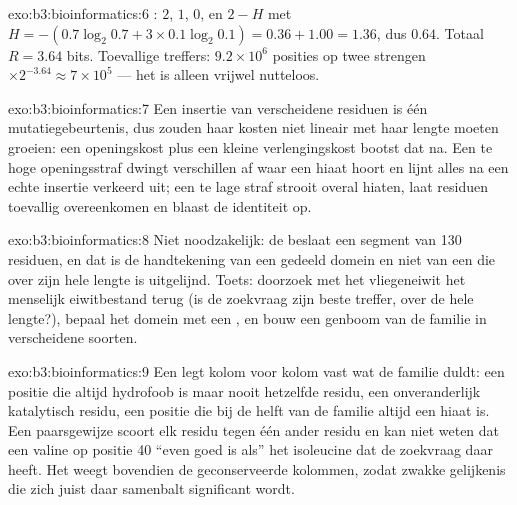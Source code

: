 \begin{solution}{exo:b3:bioinformatics:6}
: $2$, $1$, $0$, en $2 - H$ met $H = -(0.7\log_{2}
0.7 + 3\times 0.1\log_{2} 0.1) = 0.36 + 1.00 = 1.36$, dus $0.64$. Totaal
$R = 3.64$ bits. Toevallige treffers: $9.2\times 10^{6}$ posities op
twee strengen $\times 2^{-3.64} \approx 7\times 10^{5}$ --- het 
is alleen vrijwel nutteloos.
\end{solution}

\begin{solution}{exo:b3:bioinformatics:7}
Een insertie van verscheidene residuen is één mutatiegebeurtenis, dus
zouden haar kosten niet lineair met haar lengte moeten groeien: een
openingskost plus een kleine verlengingskost bootst dat na. Een te hoge
openingsstraf dwingt verschillen af waar een hiaat hoort en lijnt alles
na een echte insertie verkeerd uit; een te lage straf strooit overal
hiaten, laat residuen toevallig overeenkomen en blaast de identiteit op.
\end{solution}

\begin{solution}{exo:b3:bioinformatics:8}
Niet noodzakelijk: de  beslaat een segment van \num{130}
residuen, en dat is de handtekening van een gedeeld domein en niet van
een  die over zijn hele lengte is uitgelijnd. Toets: doorzoek
met het vliegeneiwit het menselijk eiwitbestand terug (is de zoekvraag
zijn beste treffer, over de hele lengte?), bepaal het domein met een
, en bouw een genboom van de familie in verscheidene soorten.
\end{solution}

\begin{solution}{exo:b3:bioinformatics:9}
Een  legt kolom voor kolom vast wat de familie duldt: een
positie die altijd hydrofoob is maar nooit hetzelfde residu, een
onveranderlijk katalytisch residu, een positie die bij de helft van de
familie altijd een hiaat is. Een paarsgewijze  scoort elk
residu tegen één ander residu en kan niet weten dat een valine op
positie 40 ``even goed is als'' het isoleucine dat de zoekvraag daar
heeft. Het  weegt bovendien de geconserveerde kolommen, zodat
zwakke gelijkenis die zich juist daar samenbalt significant wordt.
\end{solution}

